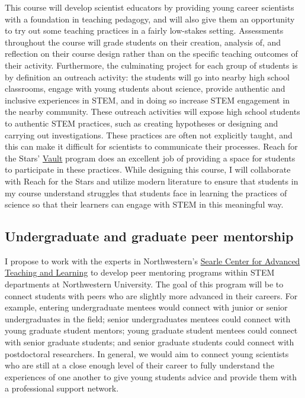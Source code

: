\documentclass[aasms,11pt, longbibliography]{article}
\begin{document}
This course will develop scientist educators by providing young career scientists with a foundation in teaching pedagogy, and will also give them an opportunity to try out some teaching practices in a fairly low-stakes setting.
Assessments throughout the course will grade students on their creation, analysis of, and reflection on their course design rather than on the specific teaching outcomes of their activity.
Furthermore, the culminating project for each group of students is by definition an outreach activity: the students will go into nearby high school classrooms, engage with young students about science, provide authentic and inclusive experiences in STEM, and in doing so increase STEM engagement in the nearby community.
These outreach activities will expose high school students to authentic STEM practices, such as creating hypotheses or designing and carrying out investigations.
These practices are often not explicitly taught, and this can make it difficult for scientists to communicate their processes.
Reach for the Stars' \href{https://avault.github.io/}{Vault} program does an excellent job of providing a space for students to participate in these practices.
While designing this course, I will collaborate with Reach for the Stars and utilize modern literature \citep[e.g.,][]{dasgupta&all2014} to ensure that students in my course understand struggles that students face in learning the practices of science so that their learners can engage with STEM in this meaningful way.

\subsection{Undergraduate and graduate peer mentorship}
\label{sct:mentoring}
I propose to work with the experts in Northwestern's \href{https://www.northwestern.edu/searle/index.html}{Searle Center for Advanced Teaching and Learning} to develop peer mentoring programs within STEM departments at Northwestern University.
The goal of this program will be to connect students with peers who are slightly more advanced in their careers.
For example, entering undergraduate mentees would connect with junior or senior undergraduates in the field; senior undergraduates mentees could connect with young graduate student mentors; young graduate student mentees could connect with senior graduate students; and senior graduate students could connect with postdoctoral researchers.
In general, we would aim to connect young scientists who are still at a close enough level of their career to fully understand the experiences of one another to give young students advice and provide them with a professional support network.
\end{document}
